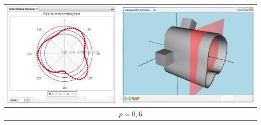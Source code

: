 \documentclass[14pt,oneside,final]{extreport}
\begin{document}
\begin{appendices}
\begin{table}[]
{{\begin{tabu}[]{|c|c|}
					\includegraphics[scale=0.55]{img/plane-position-test2} & \includegraphics[scale=0.55]{img/plane-position-test2-model}  \\ 
					\hline
					 \\ \hline

\end{tabu}}}
\end{table}
\end{appendices}
\end{document}
